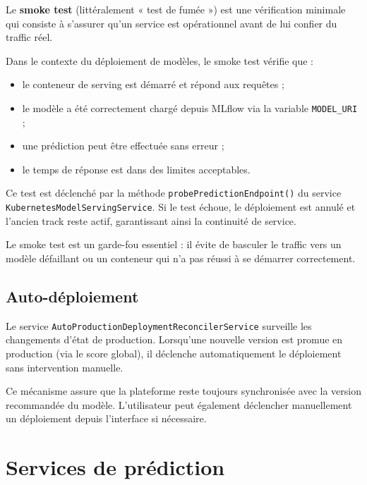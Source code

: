 Le \textbf{smoke test} (littéralement « test de fumée ») est une
vérification minimale qui consiste à s'assurer qu'un service est
opérationnel avant de lui confier du traffic réel.

Dans le contexte du déploiement de modèles, le smoke test vérifie
que :

\begin{itemize}
    \item le conteneur de serving est démarré et répond aux requêtes ;
    \item le modèle a été correctement chargé depuis MLflow via
    la variable \texttt{MODEL\_URI} ;
    \item une prédiction peut être effectuée sans erreur ;
    \item le temps de réponse est dans des limites acceptables.
\end{itemize}

Ce test est déclenché par la méthode
\texttt{probePredictionEndpoint()} du service
\texttt{KubernetesModelServingService}. Si le test échoue, le
déploiement est annulé et l'ancien track reste actif, garantissant
ainsi la continuité de service.

Le smoke test est un garde-fou essentiel : il évite de basculer
le traffic vers un modèle défaillant ou un conteneur qui n'a pas
réussi à se démarrer correctement.


\subsection{Auto-déploiement}
\label{subsec:sprint3-auto-deploy}

Le service \texttt{AutoProductionDeploymentReconcilerService} surveille
les changements d'état de production. Lorsqu'une nouvelle version est
promue en production (via le score global), il déclenche
automatiquement le déploiement sans intervention manuelle.

Ce mécanisme assure que la plateforme reste toujours synchronisée
avec la version recommandée du modèle. L'utilisateur peut également
déclencher manuellement un déploiement depuis l'interface si nécessaire.



\section{Services de prédiction}
\label{sec:sprint3-prediction}


